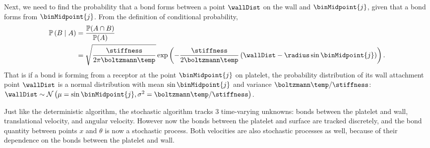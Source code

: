 Next, we need to find the probability that a bond forms between a
point $\wallDist$ on the wall and $\binMidpoint{j}$, given that a bond forms from
$\binMidpoint{j}$. From the definition of conditional probability,
\begin{align}
  \mathbb{P} \left( B \mid A \right) 
  &= \frac{\mathbb{P}(A \cap B)}
  {\mathbb{P}(A)} \nonumber \\
  \label{eq:wall-distr}
  &= \sqrt{\frac{\stiffness}{2\pi \boltzmann\temp}} \exp
    \left(-\frac{\stiffness}{2 \boltzmann \temp} \left(\wallDist -
    \radius \sin{\binMidpoint{j}} \right) \right).
\end{align}
That is if a bond is forming from a receptor at the point
$\binMidpoint{j}$ on platelet, the probability distribution of its wall
attachment point $\wallDist$ is a normal distribution with mean
$\sin\binMidpoint{j}$ and variance $\boltzmann\temp/\stiffness$:
$\wallDist \sim \mathcal{N} \left(\mu=\sin\binMidpoint{j},
  \sigma^2 = \boltzmann\temp/\stiffness \right)$.

Just like the deterministic algorithm, the stochastic algorithm tracks
3 time-varying unknowns: bonds between the platelet and wall,
translational velocity, and angular velocity. However now the bonds
between the platelet and surface are tracked discretely, and the bond
quantity between points $x$ and $\theta$ is now a stochastic
process. Both velocities are also stochastic processes as well,
because of their dependence on the bonds between the platelet and
wall.

